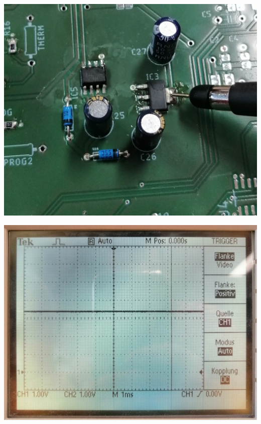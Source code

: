 {\begin{minipage}[b][8cm][t]{0.49\textwidth}
\centering
\includegraphics[width=0.9\linewidth]{graphics/HW_Val/Test_Ausgangsspannung.jpg}
\label{fig:Test_Ausgangsspannung}
\end{minipage}}
{\begin{minipage}[b][8cm][t]{0.49\textwidth}
\centering
\includegraphics[width=0.9\linewidth]{graphics/HW_Val/Ergebnis_Ausgangsspannung.jpg}
\label{fig:Ergebnis_Ausgangsspannung}
\end{minipage}}

